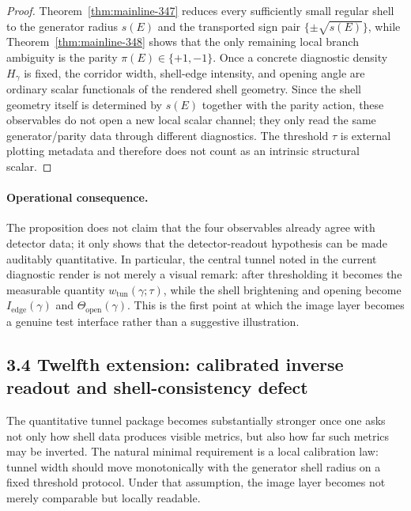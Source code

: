 \documentclass[12pt,a4paper]{article}
\begin{document}
\begin{proof}
Theorem~\ref{thm:mainline-347} reduces every sufficiently small regular shell to the generator radius $s(E)$ and the transported sign pair $\{\pm\sqrt{s(E)}\}$, while Theorem~\ref{thm:mainline-348} shows that the only remaining local branch ambiguity is the parity $\pi(E)\in\{+1,-1\}$. Once a concrete diagnostic density $H_\gamma$ is fixed, the corridor width, shell-edge intensity, and opening angle are ordinary scalar functionals of the rendered shell geometry. Since the shell geometry itself is determined by $s(E)$ together with the parity action, these observables do not open a new local scalar channel; they only read the same generator/parity data through different diagnostics. The threshold $\tau$ is external plotting metadata and therefore does not count as an intrinsic structural scalar.
\end{proof}

\paragraph{Operational consequence.}
The proposition does not claim that the four observables already agree with detector data; it only shows that the detector-readout hypothesis can be made auditably quantitative. In particular, the central tunnel noted in the current diagnostic render is not merely a visual remark: after thresholding it becomes the measurable quantity $w_{\mathrm{tun}}(\gamma;\tau)$, while the shell brightening and opening become $I_{\mathrm{edge}}(\gamma)$ and $\Theta_{\mathrm{open}}(\gamma)$. This is the first point at which the image layer becomes a genuine test interface rather than a suggestive illustration.


\subsection*{3.4 Twelfth extension: calibrated inverse readout and shell-consistency defect}
The quantitative tunnel package becomes substantially stronger once one asks not only how shell data produces visible metrics, but also how far such metrics may be inverted. The natural minimal requirement is a local calibration law: tunnel width should move monotonically with the generator shell radius on a fixed threshold protocol. Under that assumption, the image layer becomes not merely comparable but locally readable.
\end{document}
